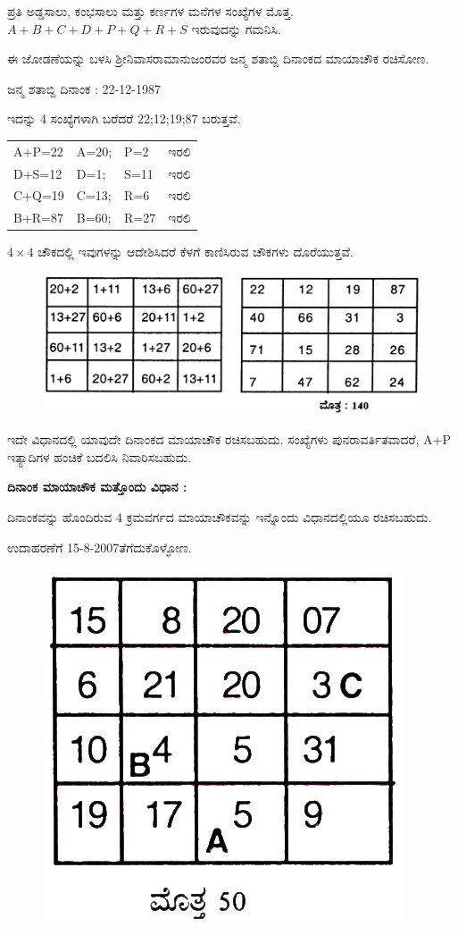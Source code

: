 ಪ್ರತಿ ಅಡ್ಡಸಾಲು, ಕಂಭಸಾಲು ಮತ್ತು ಕರ್ಣಗಳ ಮನೆಗಳ ಸಂಖ್ಯೆಗಳ ಮೊತ್ತ. $A+B+C+ D+ P+ Q+ R+ S$ ಇರುವುದನ್ನು ಗಮನಿಸಿ.

ಈ ಜೋಡಣೆಯನ್ನು ಬಳಸಿ ಶ್ರೀನಿವಾಸರಾಮಾನುಜಂರವರ ಜನ್ಮ ಶತಾಬ್ದಿ ದಿನಾಂಕದ ಮಾಯಾಚೌಕ ರಚಿಸೋಣ.

ಜನ್ಮ ಶತಾಬ್ದಿ ದಿನಾಂಕ : 22-12-1987

ಇದನ್ನು 4 ಸಂಖ್ಯೆಗಳಾಗಿ ಬರೆದರೆ 22;12;19;87 ಬರುತ್ತವೆ.

\begin{tabular}{lll	l}
A+P=22 & A=20; & P=2 & ಇರಲಿ\\
D+S=12 & D=1; & S=11 & ಇರಲಿ\\
C+Q=19 & C=13; & R=6 & ಇರಲಿ\\
B+R=87 & B=60; & R=27 & ಇರಲಿ
\end{tabular}
\smallskip

$4 \times 4$ ಚೌಕದಲ್ಲಿ ಇವುಗಳನ್ನು ಆದೇಶಿಸಿದರೆ ಕೆಳಗೆ ಕಾಣಿಸಿರುವ ಚೌಕಗಳು ದೊರೆಯುತ್ತವೆ.
\begin{figure}[H]
\includegraphics[scale=.9]{src/figures/chap3/fig3-45.jpg}
\end{figure}

ಇದೇ ವಿಧಾನದಲ್ಲಿ ಯಾವುದೇ ದಿನಾಂಕದ ಮಾಯಾಚೌಕ ರಚಿಸಬಹುದು. ಸಂಖ್ಯೆಗಳು ಪುನರಾವರ್ತಿತವಾದರೆ, A+P ಇತ್ಯಾದಿಗಳ ಹಂಚಿಕೆ ಬದಲಿಸಿ ನಿವಾರಿಸಬಹುದು.

\noindent \textbf{ದಿನಾಂಕ ಮಾಯಾಚೌಕ ಮತ್ತೊಂದು ವಿಧಾನ :}

ದಿನಾಂಕವನ್ನು ಹೊಂದಿರುವ 4 ಕ್ರಮವರ್ಗದ ಮಾಯಾಚೌಕವನ್ನು ಇನ್ನೊಂದು ವಿಧಾನದಲ್ಲಿಯೂ ರಚಿಸಬಹುದು.

ಉದಾಹರಣೆಗೆ 15-8-2007ತೆಗೆದುಕೊಳ್ಳೋಣ.

	\begin{figure}[H]
	\includegraphics[scale=.9]{src/figures/chap3/fig3-46.jpg}
	\end{figure}

